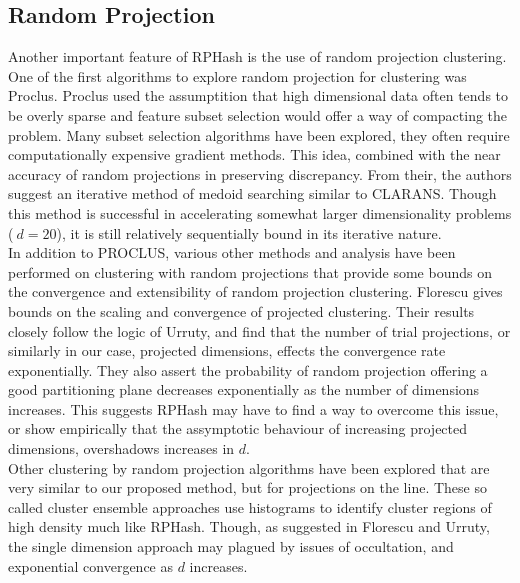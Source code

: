\documentclass[a4paper,10pt]{article}
\begin{document}
\subsection{Random Projection}
Another important feature of RPHash is the use of random projection clustering.
One of the first algorithms to explore random projection for clustering was Proclus\cite{proclus}.
Proclus used the assumptition that high dimensional data often tends to be overly sparse
and feature subset selection would offer a way of compacting the problem. Many
subset selection algorithms have been explored\cite{subset1}\cite{subset2}, they often
require computationally expensive gradient methods. This idea, combined with the near
accuracy of random projections in preserving discrepancy. From their, the authors 
suggest an iterative method of medoid searching similar to CLARANS\cite{clarans}.
Though this method is successful in accelerating somewhat larger dimensionality problems ($~d=20$),
it is still relatively sequentially bound in its iterative nature.\\

In addition to PROCLUS, various other methods and analysis have been performed
on clustering with random projections that provide some bounds on the convergence
and extensibility of random projection clustering. Florescu gives bounds on the
scaling and convergence of projected clustering\cite{florescu09}. Their results
closely follow the logic of Urruty\cite{Urruty2007}, and find that the number
of trial projections, or similarly in our case, projected dimensions, effects
the convergence rate exponentially. They also assert the probability 
of random projection offering a good partitioning plane decreases exponentially
as the number of dimensions increases. This suggests RPHash may have to find a
way to overcome this issue, or show empirically that the assymptotic behaviour
of increasing projected dimensions, overshadows increases in $d$.\\

Other clustering by random projection algorithms have been explored that are very similar to
our proposed method, but for projections on the line. These so called cluster ensemble approaches
\cite{fernrandom}\cite{alweighted06}\cite{avogadri09} use histograms to identify 
cluster regions of high density much like RPHash. Though, as suggested in Florescu and Urruty,
the single dimension approach may plagued by issues of occultation, and exponential convergence
as $d$ increases.
\end{document}
